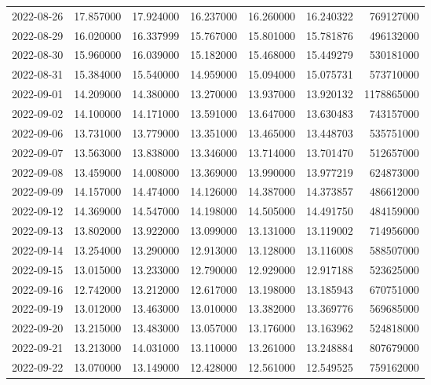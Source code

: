 \begin{tabular}{lrrrrrr}
2022-08-26 &   17.857000 &   17.924000 &   16.237000 &   16.260000 &   16.240322 &   769127000 \\
2022-08-29 &   16.020000 &   16.337999 &   15.767000 &   15.801000 &   15.781876 &   496132000 \\
2022-08-30 &   15.960000 &   16.039000 &   15.182000 &   15.468000 &   15.449279 &   530181000 \\
2022-08-31 &   15.384000 &   15.540000 &   14.959000 &   15.094000 &   15.075731 &   573710000 \\
2022-09-01 &   14.209000 &   14.380000 &   13.270000 &   13.937000 &   13.920132 &  1178865000 \\
2022-09-02 &   14.100000 &   14.171000 &   13.591000 &   13.647000 &   13.630483 &   743157000 \\
2022-09-06 &   13.731000 &   13.779000 &   13.351000 &   13.465000 &   13.448703 &   535751000 \\
2022-09-07 &   13.563000 &   13.838000 &   13.346000 &   13.714000 &   13.701470 &   512657000 \\
2022-09-08 &   13.459000 &   14.008000 &   13.369000 &   13.990000 &   13.977219 &   624873000 \\
2022-09-09 &   14.157000 &   14.474000 &   14.126000 &   14.387000 &   14.373857 &   486612000 \\
2022-09-12 &   14.369000 &   14.547000 &   14.198000 &   14.505000 &   14.491750 &   484159000 \\
2022-09-13 &   13.802000 &   13.922000 &   13.099000 &   13.131000 &   13.119002 &   714956000 \\
2022-09-14 &   13.254000 &   13.290000 &   12.913000 &   13.128000 &   13.116008 &   588507000 \\
2022-09-15 &   13.015000 &   13.233000 &   12.790000 &   12.929000 &   12.917188 &   523625000 \\
2022-09-16 &   12.742000 &   13.212000 &   12.617000 &   13.198000 &   13.185943 &   670751000 \\
2022-09-19 &   13.012000 &   13.463000 &   13.010000 &   13.382000 &   13.369776 &   569685000 \\
2022-09-20 &   13.215000 &   13.483000 &   13.057000 &   13.176000 &   13.163962 &   524818000 \\
2022-09-21 &   13.213000 &   14.031000 &   13.110000 &   13.261000 &   13.248884 &   807679000 \\
2022-09-22 &   13.070000 &   13.149000 &   12.428000 &   12.561000 &   12.549525 &   759162000 \\

\end{tabular}
